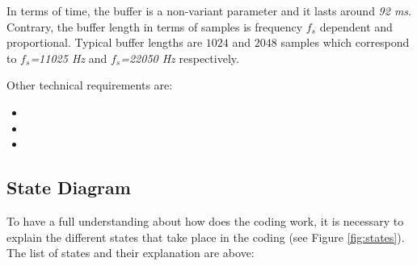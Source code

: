 \documentclass[11pt,a4paper,english]{book}  %
\theoremstyle{definition}  %
\theoremstyle{plain}  %
\theoremstyle{remark}  %
\begin{document}
In terms of time, the buffer is a non-variant parameter and it lasts around \textit{92 ms}. Contrary, the buffer length in terms of samples is frequency $f_{s}$ dependent and proportional. Typical buffer lengths are $1024$ and $2048$ samples which correspond to \textit{$f_{s}$=11025 Hz} and \textit{$f_{s}$=22050 Hz} respectively.

Other technical requirements are:

\begin{itemize}
\item
\item
\item
\end{itemize}


	\subsection{State Diagram}
	
	To have a full understanding about how does the coding work, it is necessary to explain the different states that take place in the coding (see Figure \ref{fig:states}). The list of states and their explanation are above:
	
\end{document}
